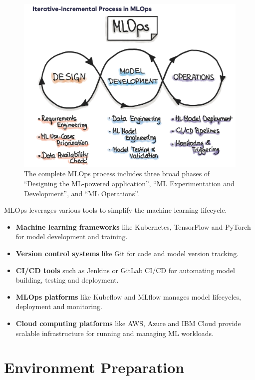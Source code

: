 \documentclass[letterpaper,12pt,notitlepage,twoside]{report}
\begin{document}
\begin{figure}[h]
	\centering
	\includegraphics[width=\textwidth]{Images/Iterative MLOps.png}
	\caption{The complete MLOps process includes three broad phases of ``Designing the ML-powered application'', ``ML Experimentation and Development'',  and ``ML Operations''.}
	\label{fig:1}
\end{figure}
\FloatBarrier

MLOps leverages various tools to simplify the machine learning lifecycle.
\begin{itemize}[label={--}]
\item \textbf{Machine learning frameworks} like Kubernetes, TensorFlow and PyTorch for model development and training.
\item \textbf{Version control systems} like Git for code and model version tracking.
\item \textbf{CI/CD tools} such as Jenkins or GitLab CI/CD for automating model building, testing and deployment.
\item \textbf{MLOps platforms} like Kubeflow and MLflow manages model lifecycles, deployment and monitoring.
\item \textbf{Cloud computing platforms} like AWS, Azure and IBM Cloud provide scalable infrastructure for running and managing ML workloads.
\end{itemize}


\section{Environment Preparation}
\end{document}
